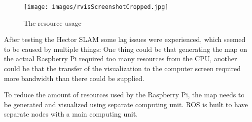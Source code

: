 
\begin{figure}[H]
	\centering
	\texttt{[image: images/rvisScreenshotCropped.jpg]}
	\caption{The resource usage}
\end{figure}


After testing the Hector SLAM some lag issues were experienced, which seemed to be caused by multiple things: One thing could be that generating the map on the actual Raspberry Pi required too many resources from the CPU, another could be that the transfer of the visualization to the computer screen required more bandwidth than there could be supplied.


To reduce the amount of resources used by the Raspberry Pi, the map needs to be generated and visualized using separate computing unit. ROS is built to have separate nodes with a main computing unit.

